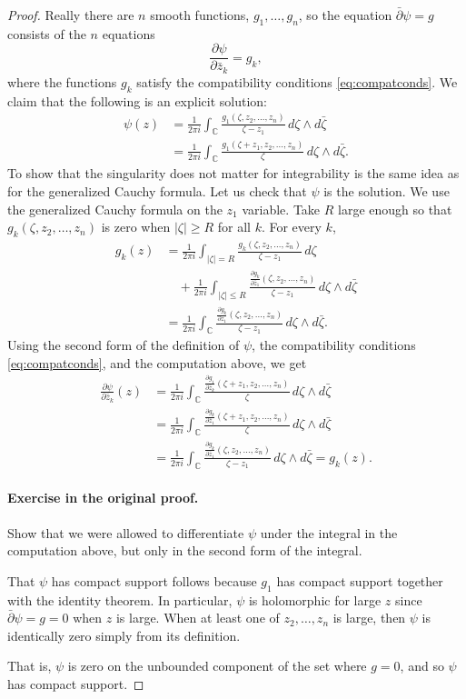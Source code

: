 \documentclass[UTF8,11pt]{ctexart}
\theoremstyle{definition}
\newcommand{\C}{\mathbb C}
\begin{document}
\begin{proof}
Really there are $n$ smooth functions, $g_1,\ldots,g_n$, so the equation $\bar\partial\psi=g$ consists of the $n$ equations
\[\frac{\partial\psi}{\partial\bar z_k}=g_k,\]
where the functions $g_k$ satisfy the compatibility conditions \eqref{eq:compatconds}. We claim that the following is an explicit solution:
\begin{align*}
\psi(z)&=\frac1{2\pi i}\int_\C\frac{g_1(\zeta,z_2,\ldots,z_n)}{\zeta-z_1}\,d\zeta\wedge d\bar\zeta\\
&=\frac1{2\pi i}\int_\C\frac{g_1(\zeta+z_1,z_2,\ldots,z_n)}{\zeta}\,d\zeta\wedge d\bar\zeta.
\end{align*}
To show that the singularity does not matter for integrability is the same idea as for the generalized Cauchy formula. Let us check that $\psi$ is the solution. We use the generalized Cauchy formula on the $z_1$ variable. Take $R$ large enough so that $g_k(\zeta,z_2,\ldots,z_n)$ is zero when $|\zeta|\geq R$ for all $k$. For every $k$,
\begin{align*}
g_k(z)&=\frac1{2\pi i}\int_{|\zeta|=R}\frac{g_k(\zeta,z_2,\ldots,z_n)}{\zeta-z_1}\,d\zeta\\
&\quad+\frac1{2\pi i}\int_{|\zeta|\leq R}\frac{\frac{\partial g_k}{\partial\bar z_1}(\zeta,z_2,\ldots,z_n)}{\zeta-z_1}\,d\zeta\wedge d\bar\zeta\\
&=\frac1{2\pi i}\int_\C\frac{\frac{\partial g_k}{\partial\bar z_1}(\zeta,z_2,\ldots,z_n)}{\zeta-z_1}\,d\zeta\wedge d\bar\zeta.
\end{align*}
Using the second form of the definition of $\psi$, the compatibility conditions \eqref{eq:compatconds}, and the computation above, we get
\begin{align*}
\frac{\partial\psi}{\partial\bar z_k}(z)
&=\frac1{2\pi i}\int_\C\frac{\frac{\partial g_1}{\partial\bar z_k}(\zeta+z_1,z_2,\ldots,z_n)}{\zeta}\,d\zeta\wedge d\bar\zeta\\
&=\frac1{2\pi i}\int_\C\frac{\frac{\partial g_k}{\partial\bar z_1}(\zeta+z_1,z_2,\ldots,z_n)}{\zeta}\,d\zeta\wedge d\bar\zeta\\
&=\frac1{2\pi i}\int_\C\frac{\frac{\partial g_k}{\partial\bar z_1}(\zeta,z_2,\ldots,z_n)}{\zeta-z_1}\,d\zeta\wedge d\bar\zeta=g_k(z).
\end{align*}
\paragraph{Exercise in the original proof.} Show that we were allowed to differentiate $\psi$ under the integral in the computation above, but only in the second form of the integral.

That $\psi$ has compact support follows because $g_1$ has compact support together with the identity theorem. In particular, $\psi$ is holomorphic for large $z$ since $\bar\partial\psi=g=0$ when $z$ is large. When at least one of $z_2,\ldots,z_n$ is large, then $\psi$ is identically zero simply from its definition.

That is, $\psi$ is zero on the unbounded component of the set where $g=0$, and so $\psi$ has compact support.
\end{proof}
\end{document}
